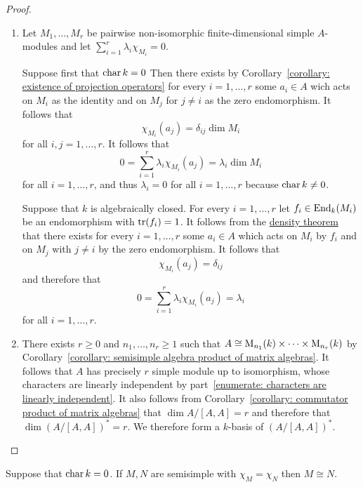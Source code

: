 \begin{proof}
  \leavevmode
  \begin{enumerate}
    \item
      Let $M_1, \dotsc, M_r$ be pairwise non-isomorphic finite-dimensional simple $A$-modules and let $\sum_{i=1}^r \lambda_i \chi_{M_i} = 0$.
      
      Suppose first that $\operatorname{char} k = 0$
      Then there exists by Corollary~\ref{corollary: existence of projection operators} for every $i = 1, \dotsc, r$ some $a_i \in A$ wich acts on $M_i$ as the identity and on $M_j$ for $j \neq i$ as the zero endomorphism.
      It follows that
      \[
          \chi_{M_i}(a_j)
        = \delta_{ij} \dim M_i
      \]
      for all $i, j = 1, \dotsc, r$.
      It follows that
      \[
          0
        = \sum_{i=1}^r \lambda_i \chi_{M_i}(a_j)
        = \lambda_i \dim M_i
      \]
      for all $i = 1, \dotsc, r$, and thus $\lambda_i = 0$ for all $i = 1, \dotsc, r$ because $\operatorname{char} k \neq 0$.
      
      Suppose that $k$ is algebraically closed.
      For every $i = 1, \dotsc, r$ let $f_i \in \operatorname{End}_k(M_i)$ be an endomorphism with $\operatorname{tr}(f_i) = 1$.
      It follows from the \hyperref[theorem: density theorem]{density theorem} that there exists for every $i = 1, \dotsc, r$ some $a_i \in A$ which acts on $M_i$ by $f_i$ and on $M_j$ with $j \neq i$ by the zero endomorphism.
      It follows that
      \[
          \chi_{M_i}(a_j)
        = \delta_{ij}
      \]
      and therefore that
      \[
          0
        = \sum_{i=1}^r \lambda_i \chi_{M_i}(a_j)
        = \lambda_i
      \]
      for all $i = 1, \dotsc, r$.
    \item
      There exists $r \geq 0$ and $n_1, \dotsc, n_r \geq 1$ such that $A \cong \operatorname{M}_{n_1}(k) \times \dotsb \times \operatorname{M}_{n_r}(k)$ by Corollary~\ref{corollary: semisimple algebra product of matrix algebras}.
      It follows that $A$ has precisely $r$ simple module up to isomorphism, whose characters are linearly independent by part~\ref*{enumerate: characters are linearly independent}.
      It also follows from Corollary~\ref{corollary: commutator product of matrix algebras} that $\dim A/[A,A] = r$ and therefore that $\dim (A/[A,A])^* = r$.
      We therefore form a $k$-basis of $(A/[A,A])^*$.
    \qedhere
  \end{enumerate}
\end{proof}


\begin{corollary}
  Suppose that $\operatorname{char} k = 0$.
  If $M, N$ are semisimple with $\chi_M = \chi_N$ then $M \cong N$.
\end{corollary}


